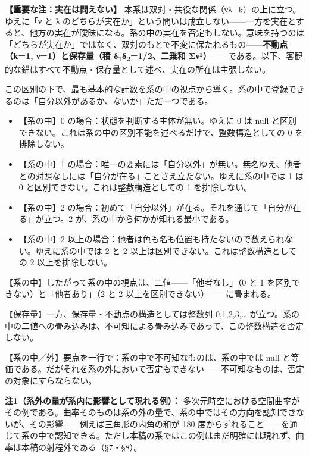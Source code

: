 \documentclass[11pt]{ltjsarticle}
\providecommand{\tightlist}{\setlength{\itemsep}{0pt}\setlength{\parskip}{0pt}}
\begin{document}
\textbf{【重要な注：実在は問えない】}
本系は双対・共役な関係（νλ=k）の上に立つ。ゆえに「ν と λ
のどちらが実在か」という問いは成立しない------一方を実在とすると、他方の実在が曖昧になる。系の中の実在を否定もしない。意味を持つのは「どちらが実在か」ではなく、双対のもとで不変に保たれるもの------\textbf{不動点（k=1,
ν=1）と保存量（積 δ\textsubscript{1}δ\textsubscript{2}=1/2、二乗和
Σν²）}------である。以下、客観的な錨はすべて不動点・保存量として述べ、実在の所在は主張しない。

この区別の下で、最も基本的な計数を系の中の視点から導く。系の中で登録できるのは「自分以外があるか、ないか」ただ一つである。

\begin{itemize}
\tightlist
\item
  【系の中】0 の場合：状態を判断する主体が無い。ゆえに 0 は null
  と区別できない。これは系の中の区別不能を述べるだけで、整数構造としての
  0 を排除しない。
\item
  【系の中】1
  の場合：唯一の要素には「自分以外」が無い。無名ゆえ、他者との対照なしには「自分が在る」ことさえ立たない。ゆえに系の中では
  1 は 0 と区別できない。これは整数構造としての 1 を排除しない。
\item
  【系の中】2
  の場合：初めて「自分以外」が在る。それを通じて「自分が在る」が立つ。2
  が、系の中から何かが知れる最小である。
\item
  【系の中】2
  以上の場合：他者は色も名も位置も持たないので数えられない。ゆえに系の中では
  2 と 2 以上は区別できない。これは整数構造としての 2 以上を排除しない。
\end{itemize}

【系の中】したがって系の中の視点は、二値------「他者なし」（0 と 1
を区別できない）と「他者あり」（2 と 2
以上を区別できない）------に畳まれる。

【保存量】一方、保存量・不動点の構造としては整数列 0,1,2,3,\ldots{}
が立つ。系の中の二値への畳み込みは、不可知による畳み込みであって、この整数構造を否定しない。

【系の中／外】要点を一行で：系の中で不可知なものは、系の中では null
と等価である。だがそれを系の外において否定もできない------不可知なものは、否定の対象にすらならない。

\textbf{注1（系外の量が系内に影響として現れる例）：}
多次元時空における空間曲率がその例である。曲率そのものは系の外の量で、系の中ではその方向を認知できないが、その影響------例えば三角形の内角の和が
180
度からずれること------を通じて系の中で認知できる。ただし本稿の系ではこの例はまだ明確には現れず、曲率は本稿の射程外である（§7・§8）。
\end{document}
